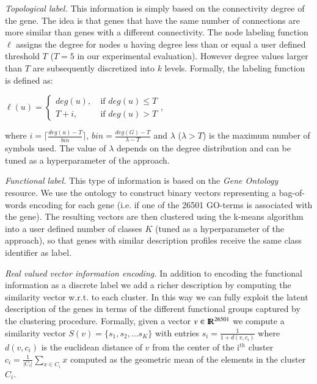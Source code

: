 \documentclass[review]{elsarticle}
\newcommand{\IR}{\rm I\!R}
\begin{document}
\textit{Topological label.} This information is simply based on the connectivity degree of the gene. The idea is that genes that have the same number of connections are more similar than genes with a different connectivity. The node labeling function $\ell$ assigns the degree for nodes $u$ having degree less than or equal a user defined threshold $T$ ($T=5$ in our experimental evaluation). However degree values larger than $T$ are subsequently discretized into $k$ levels. Formally, the labeling function is defined as:
\begin{center}
$\ell(u) = \left\{
	\begin{array}{ll}
		deg(u),\  & \mbox{if } deg(u) \leq T \\
		T+i,\ & \mbox{if } deg(u) > T
	\end{array}
\right.$,
\end{center}
where $i = \lceil \frac{deg(u)-T}{bin}\rceil$, $bin = \frac{deg(G)-T}{\lambda - T}$ and $\lambda$ ($\lambda > T$) is the maximum number of symbols used. The value of $\lambda$ depends on the degree distribution and can be tuned as a hyperparameter of the approach.


\textit{Functional label.} This type of information is based on the \textit{Gene Ontology} \cite{gene2004gene} resource. We use the ontology to construct binary vectors representing a bag-of-words encoding for each gene (i.e. if one of the 26501 GO-terms is associated with the gene). The resulting vectors are then clustered using the k-means algorithm  into a user defined number of classes $K$ (tuned as a hyperparameter of the approach), so that genes with similar description profiles receive the same class identifier as label. 

\textit{Real valued vector information encoding.}
In addition to encoding the functional information as a discrete label we add a richer description by computing the similarity vector w.r.t. to each cluster. In this way we can fully exploit the latent description of the genes in terms of the different functional groups captured by the clustering procedure. Formally, given a vector $v \in \IR^{26501}$ we compute a similarity vector $S(v)= \{s_1, s_2, \ldots s_K\}$ with entries $s_i = \frac{1}{1+d(v,c_i)}$ where $d(v,c_i)$ is the euclidean distance of $v$ from the center of the i$^{th}$ cluster $c_i = \frac{1}{|C_i|}\sum_{x \in C_i} x$ computed as the geometric mean of the elements in the cluster $C_i$.
\end{document}

